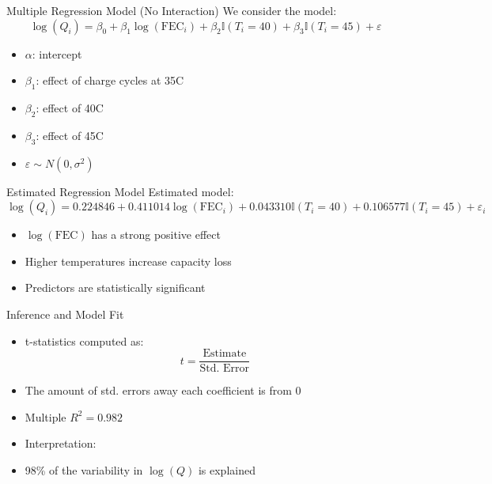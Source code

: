 \documentclass[aspectratio=169]{beamer}
\begin{document}
\begin{frame}{Multiple Regression Model (No Interaction)}
We consider the model:
\[
\log(Q_i) =
\beta_0
+ \beta_1 \log(\text{FEC}_i)
+ \beta_2 \mathbb{I}(T_i = 40)
+ \beta_3 \mathbb{I}(T_i = 45)
+ \varepsilon
\]

\begin{itemize}
  \item $\alpha$: intercept
  \item $\beta_1$: effect of charge cycles at 35C
  \item $\beta_2$: effect of 40C
  \item $\beta_3$: effect of 45C
  \item $\varepsilon \sim N(0,\sigma^2)$
\end{itemize}

\end{frame}

\begin{frame}{Estimated Regression Model}
Estimated model:
\[
\log(Q_i) =
0.224846
+ 0.411014 \log(\text{FEC}_i)
+ 0.043310 \mathbb{I}(T_i = 40)
+ 0.106577 \mathbb{I}(T_i = 45)
+ \varepsilon_i
\]

\begin{itemize}
  \item $\log(\text{FEC})$ has a strong positive effect
  \item Higher temperatures increase capacity loss
  \item Predictors are statistically significant
\end{itemize}

\end{frame}

\begin{frame}{Inference and Model Fit}
\begin{itemize}
  \item t-statistics computed as:
  \[
  t = \frac{\text{Estimate}}{\text{Std. Error}}
  \]
  \item The amount of std. errors away each coefficient is from 0
\end{itemize}

\begin{itemize}
  \item Multiple $R^2 = 0.982$
  \item Interpretation:
  \item 98\% of the variability in $\log(Q)$ is explained
\end{itemize}

\end{frame}
\end{document}
